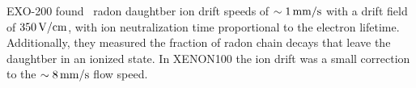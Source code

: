 EXO-200 found~\cite{Albert:2015vma} radon daughtber ion drift speeds of $\sim 1\, \mathrm{mm/s}$ with a drift field of $350\, \mathrm{V/cm}$, with ion neutralization time proportional to the electron lifetime. Additionally, they measured the fraction of radon chain decays that leave the daughtber in an ionized state. In XENON100 the ion drift was a small correction to the $\sim 8\, \mathrm{mm/s}$ flow speed.
